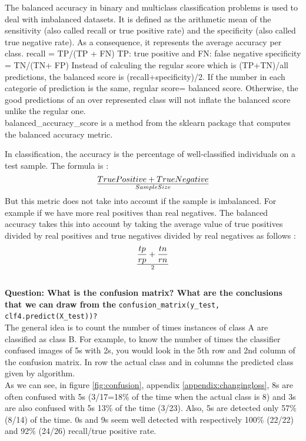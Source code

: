 The balanced accuracy in binary and multiclass classification problems is used to deal with imbalanced datasets. 
It is defined as the arithmetic mean of the sensitivity (also called recall or true positive rate) and the specificity (also called true negative rate). As a consequence, it represents the average accuracy per class.
recall = TP/(TP + FN) TP: true positive and FN: false negative
specificity = TN/(TN+ FP)
Instead of calculing the regular score which is (TP+TN)/all predictions, the balanced score is (recall+specificity)/2. If the number in each categorie of prediction is the same, regular score= balanced score. Otherwise, the good predictions of an over represented class will not inflate the balanced score unlike the regular one.\\

balanced\_accuracy\_score is a method from the sklearn package that computes the balanced accuracy metric. 


In classification, the accuracy is the percentage of well-classified individuals on a test sample. The formula is : \begin{equation*}
True Positive + 	True Negative \over Sample Size
\end{equation*}
But this metric does not take into account if the sample is imbalanced. For example if we have more real positives than real negatives. The balanced accuracy takes this into account by taking the average value of true positives divided by real positives and true negatives divided by real negatives as follows : \begin{equation*} \frac{tp}{rp}+ \frac{tn}{rn} \over 2
\end{equation*} \\

\textbf{Question: What is the confusion matrix? What are the conclusions that we can draw from the} \verb|confusion_matrix(y_test, clf4.predict(X_test))?| \\

The general idea is to count the number of times instances of class A are classified as class B. For example, to know the number of times the classifier confused images of 5s with 2s, you would look in the 5th row and 2nd column of the confusion matrix. In row the actual class and in columns the predicted class given by algorithm. \\

As we can see, in figure \ref{fig:confusion}, appendix \ref{appendix:changingloss}, 8s are often confused with 5s (3/17=18\% of the time when the actual class is 8) and 3s are also confused with 5s 13\% of the time (3/23). Also, 5s are detected only 57\% (8/14) of the time. 0s and 9s seem well detected with respectively 100\% (22/22) and 92\% (24/26) recall/true positive rate.\\

